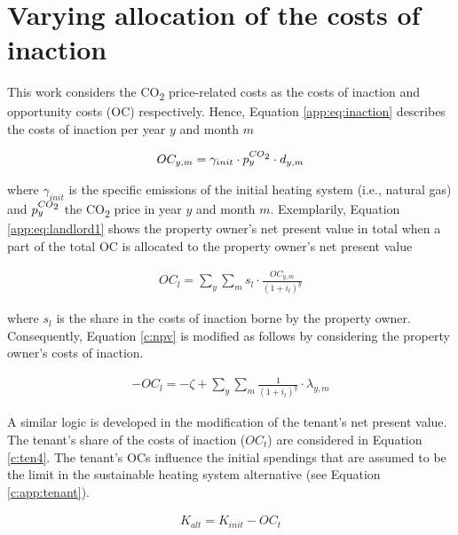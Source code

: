 \documentclass[review]{elsarticle}
\begin{document}


\section{Varying allocation of the costs of inaction}\label{app:varying}
This work considers the CO\textsubscript{2} price-related costs as the costs of inaction and opportunity costs (OC) respectively. Hence, Equation \ref{app:eq:inaction} describes the costs of inaction per year $y$ and month $m$

\begin{align}\label{app:eq:inaction}
	OC_{y,m} =    \gamma_{init} \cdot p_{y}^{CO\textsubscript{2}} \cdot d_{y,m}
\end{align}

where $\gamma_{init}$ is the specific emissions of the initial heating system (i.e., natural gas) and $p_{y}^{CO\textsubscript{2}}$ the CO\textsubscript{2} price in year $y$ and month $m$. Exemplarily, Equation \ref{app:eq:landlord1} shows the property owner's net present value in total when a part of the total OC is allocated to the property owner's net present value

\begin{align}\label{app:eq:landlord1}
	OC_{l} =  \sum_{y} \sum_{m} s_l \cdot \frac{OC_{y,m}}{(1+i_l)^y} 
\end{align}

where $s_l$ is the share in the costs of inaction borne by the property owner. Consequently, Equation \ref{c:npv} is modified as follows by considering the property owner's costs of inaction.

\begin{align}\label{app:eq:landlord}
	-OC_{l} =  -\zeta + \sum_{y} \sum_{m} \frac{1}{(1+i_l)^y} \cdot \lambda_{y,m}
\end{align}

A similar logic is developed in the modification of the tenant's net present value. The tenant's share of the costs of inaction ($OC_{t}$) are considered in Equation \ref{c:ten4}. The tenant's OCs influence the initial spendings that are assumed to be the limit in the sustainable heating system alternative (see Equation \ref{c:app:tenant}).

\begin{align}\label{c:app:tenant}
	K_{alt} = K_{init} - OC_{t}
\end{align}
\end{document}
